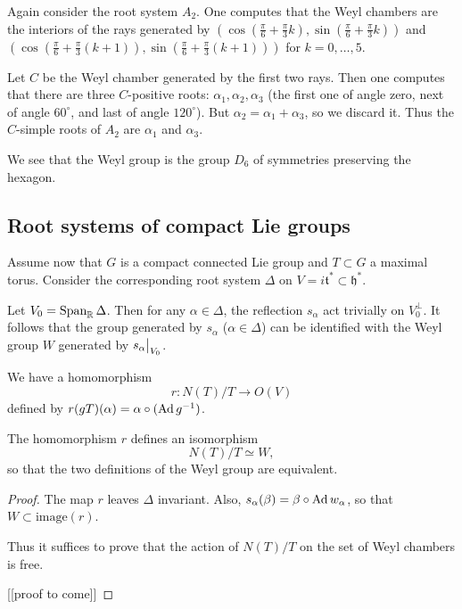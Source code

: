 \documentclass[11pt, english]{article}
\begin{document}
\begin{example}
 Again consider the root system $A_2$. One computes that the Weyl chambers are the interiors of the rays generated by $\left(\cos( \frac{\pi}{6}+\frac{\pi}{3}k), \sin( \frac{\pi}{6} + \frac{\pi}3 k)\right)$ and $\left(\cos( \frac{\pi}{6}+\frac{\pi}{3}(k+1)), \sin( \frac{\pi}{6} + \frac{\pi}3 (k+1))\right)$ for $k=0,\ldots,5$.

Let $C$ be the Weyl chamber generated by the first two rays. Then one computes that there are three $C$-positive roots: $\alpha_1,\alpha_2,\alpha_3$ (the first one of angle zero, next of angle $60^\circ$, and last of angle $120^\circ$). But $\alpha_2=\alpha_1+\alpha_3$, so we discard it. Thus the $C$-simple roots of $A_2$ are $\alpha_1$ and $\alpha_3$.

We see that the Weyl group is the group $D_6$ of symmetries preserving the hexagon.
\end{example}

\subsection{Root systems of compact Lie groups}

Assume now that $G$ is a compact connected Lie group and $T \subset G$ a maximal torus. Consider the corresponding root system $\Delta$ on $V=i \mathfrak t ^\ast \subset \mathfrak h^\ast$. 

Let $V_0 = \operatorname{Span}_{\mathbb{R}} \Delta$. Then for any $\alpha \in \Delta$, the reflection $s_\alpha$ act trivially on $V_0^\perp$. It follows that the group generated by $s_\alpha$ ($\alpha \in \Delta$) can be identified with the Weyl group $W$ generated by $\restr{s_\alpha}{V_0}$.

We have a homomorphism
$$
r \colon N(T) / T \to O(V)
$$
defined by $r(gT)(\alpha)=  \alpha \circ (\operatorname{Ad} g^{-1})$.

\begin{thm}
 The homomorphism $r$ defines an isomorphism 
$$
N(T) / T \simeq W,
$$
so that the two definitions of the Weyl group are equivalent.
\end{thm}

\begin{proof}
  The map $r$ leaves $\Delta$ invariant. Also, $s_\alpha(\beta) = \beta \circ \operatorname{Ad} w_\alpha$, so that $W \subset \mathrm{image} (r)$.

Thus it suffices to prove that the action of $N(T)/T$ on the set of Weyl chambers is free. 

[[proof to come]]
\end{proof}
\end{document}
